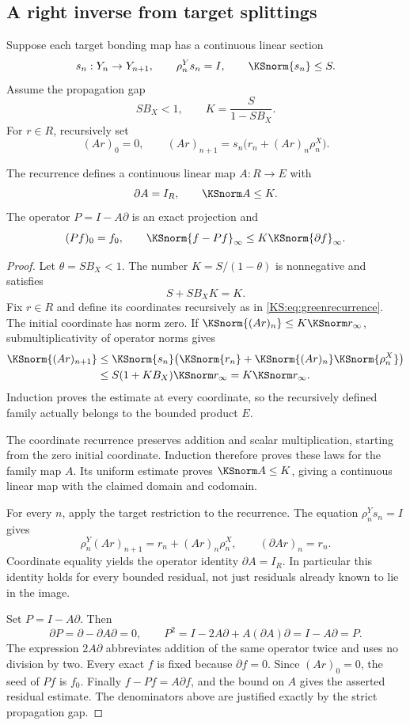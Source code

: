\subsection{A right inverse from target splittings}
Suppose each target bonding map has a continuous linear section
\[
 s_n:Y_n\to Y_{n+1},\qquad \rho^Y_ns_n=I,\qquad \KSnorm{s_n}\le S.
\]
Assume the propagation gap
\begin{equation}\label{KS:eq:splitgap}
 SB_X<1,\qquad K=\frac{S}{1-SB_X}.
\end{equation}
For \(r\in R\), recursively set
\begin{equation}\label{KS:eq:greenrecurrence}
 (Ar)_0=0,\qquad
 (Ar)_{n+1}=s_n\bigl(r_n+(Ar)_n\rho^X_n\bigr).
\end{equation}

\begin{KStheorem}\label{KS:KS20}
The recurrence defines a continuous linear map \(A:R\to E\) with
\[
 \partial A=I_R,\qquad \KSnorm A\le K.
\]
The operator \(P=I-A\partial\) is an exact projection and
\[
 (Pf)_0=f_0,\qquad
 \KSnorm{f-Pf}_\infty\le K\KSnorm{\partial f}_\infty.
\]
\end{KStheorem}
\begin{proof}
Let $\theta=SB_X<1$. The number $K=S/(1-\theta)$ is nonnegative and satisfies
\[
 S+SB_XK=K.
\]
Fix $r\in R$ and define its coordinates recursively as in \eqref{KS:eq:greenrecurrence}. The initial coordinate has norm zero. If $\KSnorm{(Ar)_n}\le K\KSnorm r_\infty$, submultiplicativity of operator norms gives
\[
 \begin{aligned}
 \KSnorm{(Ar)_{n+1}}
 &\le\KSnorm{s_n}\bigl(\KSnorm{r_n}+\KSnorm{(Ar)_n}\KSnorm{\rho^X_n}\bigr)\\
 &\le S(1+KB_X)\KSnorm r_\infty=K\KSnorm r_\infty.
 \end{aligned}
\]
Induction proves the estimate at every coordinate, so the recursively defined family actually belongs to the bounded product $E$.

The coordinate recurrence preserves addition and scalar multiplication, starting from the zero initial coordinate. Induction therefore proves these laws for the family map $A$. Its uniform estimate proves $\KSnorm A\le K$, giving a continuous linear map with the claimed domain and codomain.

For every $n$, apply the target restriction to the recurrence. The equation $\rho^Y_ns_n=I$ gives
\[
 \rho^Y_n(Ar)_{n+1}=r_n+(Ar)_n\rho^X_n,
 \qquad (\partial Ar)_n=r_n.
\]
Coordinate equality yields the operator identity $\partial A=I_R$. In particular this identity holds for every bounded residual, not just residuals already known to lie in the image.

Set $P=I-A\partial$. Then
\[
 \partial P=\partial-\partial A\partial=0,\qquad
 P^2=I-2A\partial+A(\partial A)\partial=I-A\partial=P.
\]
The expression $2A\partial$ abbreviates addition of the same operator twice and uses no division by two. Every exact $f$ is fixed because $\partial f=0$. Since $(Ar)_0=0$, the seed of $Pf$ is $f_0$. Finally $f-Pf=A\partial f$, and the bound on $A$ gives the asserted residual estimate. The denominators above are justified exactly by the strict propagation gap.
\end{proof}
